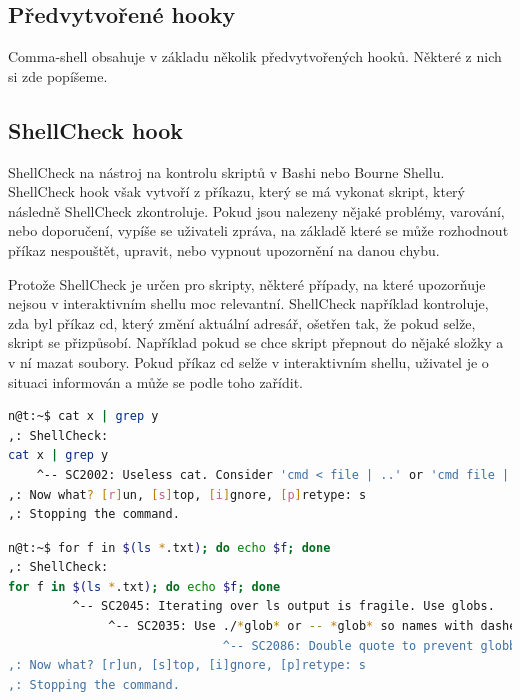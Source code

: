 \documentclass[thesis=M,czech]{FITthesis}[2012/06/26]
\begin{document}
\subsection{Předvytvořené hooky}

Comma-shell obsahuje v základu několik předvytvořených hooků. Některé z nich si zde popíšeme. 


%
\subsection{ShellCheck hook}

ShellCheck na nástroj na kontrolu skriptů v Bashi nebo Bourne Shellu. ShellCheck hook však vytvoří z příkazu, který se má vykonat skript, který následně ShellCheck zkontroluje. Pokud jsou nalezeny nějaké problémy, varování, nebo doporučení, vypíše se uživateli zpráva, na základě které se může rozhodnout příkaz nespouštět, upravit, nebo vypnout upozornění na danou chybu.

Protože ShellCheck je určen pro skripty, některé případy, na které upozorňuje nejsou v interaktivním shellu moc relevantní. ShellCheck například kontroluje, zda byl příkaz cd, který změní aktuální adresář, ošetřen tak, že pokud selže, skript se přizpůsobí. Například pokud se chce skript přepnout do nějaké složky a v ní mazat soubory. Pokud příkaz cd selže v interaktivním shellu, uživatel je o situaci informován a může se podle toho zařídit.

\begin{minipage}{\linewidth}
\begin{lstlisting}[language=bash, caption={ShellCheck}, label={lst:sccat}]
n@t:~$ cat x | grep y
,: ShellCheck: 
cat x | grep y
    ^-- SC2002: Useless cat. Consider 'cmd < file | ..' or 'cmd file | ..' instead.
,: Now what? [r]un, [s]top, [i]gnore, [p]retype: s
,: Stopping the command.
\end{lstlisting}
\end{minipage}


\begin{minipage}{\linewidth}
\begin{lstlisting}[language=bash, caption={ShellCheck}, label={lst:csfor}]
n@t:~$ for f in $(ls *.txt); do echo $f; done
,: ShellCheck: 
for f in $(ls *.txt); do echo $f; done
         ^-- SC2045: Iterating over ls output is fragile. Use globs.
              ^-- SC2035: Use ./*glob* or -- *glob* so names with dashes won't become options.
                              ^-- SC2086: Double quote to prevent globbing and word splitting.
,: Now what? [r]un, [s]top, [i]gnore, [p]retype: s
,: Stopping the command.

\end{lstlisting}
\end{minipage}
\end{document}
